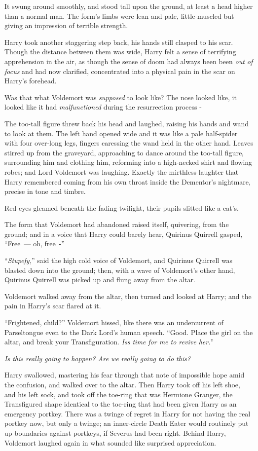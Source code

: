 It swung around smoothly, and stood tall upon the ground, at least a head higher than a normal man. The form's limbs were lean and pale, little-muscled but giving an impression of terrible strength.

Harry took another staggering step back, his hands still clasped to his scar. Though the distance between them was wide, Harry felt a sense of terrifying apprehension in the air, as though the sense of doom had always been been \emph{out of focus} and had now clarified, concentrated into a physical pain in the scar on Harry's forehead.

Was that what Voldemort was \emph{supposed} to look like? The nose looked like, it looked like it had \emph{malfunctioned} during the resurrection process -

The too-tall figure threw back his head and laughed, raising his hands and wand to look at them. The left hand opened wide and it was like a pale half-spider with four over-long legs, fingers caressing the wand held in the other hand. Leaves stirred up from the graveyard, approaching to dance around the too-tall figure, surrounding him and clothing him, reforming into a high-necked shirt and flowing robes; and Lord Voldemort was laughing. Exactly the mirthless laughter that Harry remembered coming from his own throat inside the Dementor's nightmare, precise in tone and timbre.

Red eyes gleamed beneath the fading twilight, their pupils slitted like a cat's.

The form that Voldemort had abandoned raised itself, quivering, from the ground; and in a voice that Harry could barely hear, Quirinus Quirrell gasped, ``Free~--- oh, free~-''

``\emph{Stupefy,}'' said the high cold voice of Voldemort, and Quirinus Quirrell was blasted down into the ground; then, with a wave of Voldemort's other hand, Quirinus Quirrell was picked up and flung away from the altar.

Voldemort walked away from the altar, then turned and looked at Harry; and the pain in Harry's scar flared at it.

``Frightened, child?'' Voldemort hissed, like there was an undercurrent of Parseltongue even to the Dark Lord's human speech. ``Good. Place the girl on the altar, and break your Transfiguration. \emph{Iss time for me to revive her.}''

\emph{Is this really going to happen? Are we really going to do this?}

Harry swallowed, mastering his fear through that note of impossible hope amid the confusion, and walked over to the altar. Then Harry took off his left shoe, and his left sock, and took off the toe-ring that was Hermione Granger, the Transfigured shape identical to the toe-ring that had been given Harry as an emergency portkey. There was a twinge of regret in Harry for not having the real portkey now, but only a twinge; an inner-circle Death Eater would routinely put up boundaries against portkeys, if Severus had been right. Behind Harry, Voldemort laughed again in what sounded like surprised appreciation.

